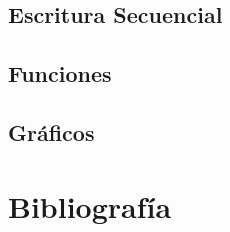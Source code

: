 \subsection{Escritura Secuencial}

\subsection{Funciones}

\subsection{Gráficos}

\section{Bibliografía}



